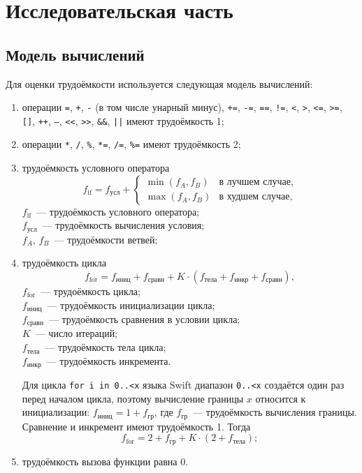 \section{Исследовательская часть}

\subsection{Модель вычислений}
Для оценки трудоёмкости используется следующая модель вычислений:
\begin{enumerate}
	\item операции \texttt{=}, \texttt{+}, \texttt{-} (в том числе унарный минус), \texttt{+=}, \texttt{-=}, \texttt{==}, \texttt{!=}, \texttt{<}, \texttt{>}, \texttt{<=}, \texttt{>=}, \texttt{[]}, \texttt{++}, \texttt{--}, \texttt{<<}, \texttt{>>}, \texttt{\&\&}, \texttt{||} имеют трудоёмкость 1;
	\item операции \texttt{*}, \texttt{/}, \texttt{\%}, \texttt{*=}, \texttt{/=}, \texttt{\%=} имеют трудоёмкость 2;
	\item трудоёмкость условного оператора
	\begin{equation}
		f_{\text{if}} = f_{\text{усл}} +
		\begin{cases}
			\min(f_A, f_B) & \text{в лучшем случае}, \\
			\max(f_A, f_B) & \text{в худшем случае},
		\end{cases}
	\end{equation}
	\where{} $f_{\text{if}}$~--- трудоёмкость условного оператора;\\
	$f_{\text{усл}}$~--- трудоёмкость вычисления условия;\\
	$f_A$, $f_B$~--- трудоёмкости ветвей;
	\item трудоёмкость цикла
	\begin{equation}
		\label{eq:f-for}
		f_{\text{for}} = f_{\text{иниц}} + f_{\text{сравн}} + K \cdot (f_{\text{тела}} + f_{\text{инкр}} + f_{\text{сравн}}),
	\end{equation}
	\where{} $f_{\text{for}}$~--- трудоёмкость цикла;\\
	$f_{\text{иниц}}$~--- трудоёмкость инициализации цикла;\\
	$f_{\text{сравн}}$~--- трудоёмкость сравнения в условии цикла;\\
	$K$~--- число итераций;\\
	$f_{\text{тела}}$~--- трудоёмкость тела цикла;\\
	$f_{\text{инкр}}$~--- трудоёмкость инкремента.

	Для цикла \texttt{for i in 0..<x} языка Swift диапазон \texttt{0..<x} создаётся один раз перед началом цикла, поэтому вычисление границы $x$ относится к инициализации: $f_{\text{иниц}} = 1 + f_{\text{гр}}$, где $f_{\text{гр}}$~--- трудоёмкость вычисления границы. Сравнение и инкремент имеют трудоёмкость 1. Тогда
	\begin{equation}
		\label{eq:f-for-swift}
		f_{\text{for}} = 2 + f_{\text{гр}} + K \cdot (2 + f_{\text{тела}});
	\end{equation}
	\item трудоёмкость вызова функции равна 0.
\end{enumerate}


